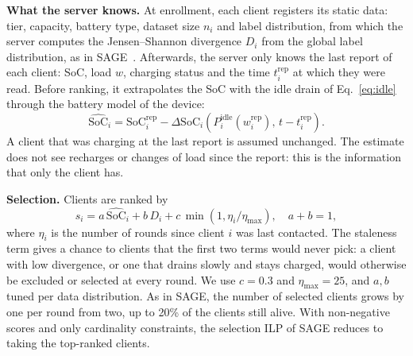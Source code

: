 \textbf{What the server knows.}
At enrollment, each client registers its static data: tier, capacity, battery
type, dataset size $n_i$ and label distribution, from which the server computes
the Jensen--Shannon divergence $D_i$ from the global label distribution, as in
SAGE~\cite{savoia2026sage}. Afterwards, the server only knows the last report
of each client: SoC, load $w$, charging status and the time $t_i^{\mathrm{rep}}$
at which they were read. Before ranking, it extrapolates the SoC with the idle
drain of Eq.~\eqref{eq:idle} through the battery model of the device:
\begin{equation}
  \widehat{\mathrm{SoC}}_i = \mathrm{SoC}_i^{\mathrm{rep}}
  - \Delta\mathrm{SoC}_i\!\left(P^{\mathrm{idle}}_i(w_i^{\mathrm{rep}}),\,
    t - t_i^{\mathrm{rep}}\right).
  \label{eq:estimate}
\end{equation}
A client that was charging at the last report is assumed unchanged. The
estimate does not see recharges or changes of load since the report: this is
the information that only the client has.

\textbf{Selection.}
Clients are ranked by
\begin{equation}
  s_i = a\,\widehat{\mathrm{SoC}}_i + b\,D_i
      + c\,\min\!\left(1, \eta_i/\eta_{\max}\right), \quad a+b=1,
  \label{eq:score}
\end{equation}
where $\eta_i$ is the number of rounds since client $i$ was last contacted. The
staleness term gives a chance to clients that the first two terms would never
pick: a client with low divergence, or one that drains slowly and stays
charged, would otherwise be excluded or selected at every round. We use $c=0.3$
and $\eta_{\max}=25$, and $a,b$ tuned per data distribution. As in SAGE, the
number of selected clients grows by one per round from two, up to 20\% of the
clients still alive. With non-negative scores and only cardinality
constraints, the selection ILP of SAGE reduces to taking the top-ranked
clients.

